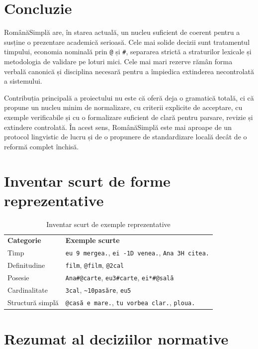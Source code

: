\documentclass[12pt,onecolumn,letterpaper]{article}
\newcommand{\rs}[1]{\texttt{#1}}
\newcommand{\RStablelayout}{%
\footnotesize
\setlength{\tabcolsep}{6pt}%
\renewcommand{\arraystretch}{1.12}%
\arrayrulecolor{RSRule}%
}
\begin{document}
\section{Concluzie}

RomânăSimplă are, în starea actuală, un nucleu suficient de coerent pentru a
susține o prezentare academică serioasă. Cele mai solide decizii sunt tratamentul
timpului, economia nominală prin \rs{@} și \rs{\#}, separarea strictă a
straturilor lexicale și metodologia de validare pe loturi mici. Cele mai mari
rezerve rămân forma verbală canonică și disciplina necesară pentru a împiedica
extinderea necontrolată a sistemului.

Contribuția principală a proiectului nu este că oferă deja o gramatică totală,
ci că propune un nucleu minim de normalizare, cu criterii explicite de acceptare,
cu exemple verificabile și cu o formalizare suficient de clară pentru parsare,
revizie și extindere controlată. În acest sens, RomânăSimplă este mai aproape de
un protocol lingvistic de lucru și de o propunere de standardizare locală decât
de o reformă complet închisă.

\appendix

\section{Inventar scurt de forme reprezentative}

\begin{table}[h!]
\centering
\RStablelayout
\begin{tabularx}{\linewidth}{@{}lY@{}}
\textbf{Categorie} & \textbf{Exemple scurte} \\
Timp & \rs{eu 9 mergea.}, \rs{ei -1D venea.}, \rs{Ana 3H citea.} \\
Definitudine & \rs{film}, \rs{@film}, \rs{@2cal} \\
Posesie & \rs{Ana\#@carte}, \rs{eu3\#carte}, \rs{ei*\#@sală} \\
Cardinalitate & \rs{3cal}, \rs{\textasciitilde10pasăre}, \rs{eu5} \\
Structură simplă & \rs{@casă e mare.}, \rs{tu vorbea clar.}, \rs{ploua.} \\
\bottomrule
\end{tabularx}
\caption{Inventar scurt de exemple reprezentative}
\end{table}

\section{Rezumat al deciziilor normative}
\end{document}
